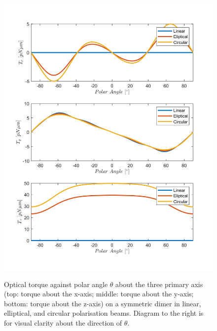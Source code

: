 \begin{figure}
	\includegraphics[width=0.65\linewidth,height= 15cm]{torque_different_polarisations.png}
	\caption{Optical torque against polar angle $\theta$ about the three primary axis (top: torque about the x-axis; middle: torque about the y-axis; bottom: torque about the z-axis) on a symmetric dimer in linear, elliptical, and circular polarisation beams. Diagram to the right is for visual clarity about the direction of $\theta$.\vspace{4.5cm}}
\end{figure}
\newpage

